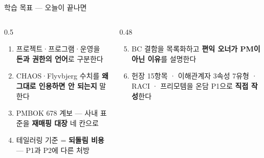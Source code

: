 \begin{frame}{학습 목표 — 오늘이 끝나면}
\begin{columns}[T]
\begin{column}{0.5\textwidth}
\begin{enumerate}
\item 프로젝트·프로그램·운영을 \textbf{돈과 권한의 언어}로 구분한다
\item CHAOS·Flyvbjerg 수치를 \textbf{왜 그대로 인용하면 안 되는지} 말한다
\item PMBOK 6\ra{}7\ra{}8 계보 — 사내 표준을 \textbf{재매핑 대장} 네 칸으로
\item 테일러링 기준 = \textbf{되돌림 비용} — P1과 P2에 다른 처방
\end{enumerate}
\end{column}
\begin{column}{0.48\textwidth}
\begin{enumerate}\setcounter{enumi}{4}
\item BC 결함을 목록화하고 \textbf{편익 오너가 PM이 아닌 이유}를 설명한다
\item 헌장 15항목 · 이해관계자 3속성 7유형 · RACI · 프리모템을 온담 P1으로 \textbf{직접 작성}한다
\end{enumerate}
\end{column}
\end{columns}
\end{frame}

